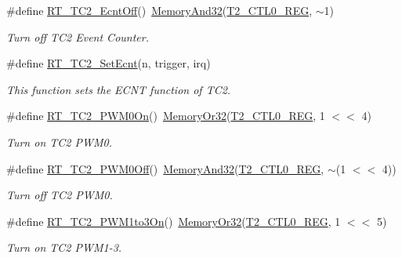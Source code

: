 \begin{DoxyCompactItemize}
\#define \mbox{\hyperlink{a00047_af77e205baae8e267fda5374c167ab76c}{R\+T\+\_\+\+T\+C2\+\_\+\+Ecnt\+Off}}()~\mbox{\hyperlink{a00020_ad87cedffcaadc51db22594fce55173d4}{Memory\+And32}}(\mbox{\hyperlink{a00020_adadaa0ab1ebbd7ba9b70dfd24c3ed44daf2e9deb36631241181cbf09e8d959475}{T2\+\_\+\+C\+T\+L0\+\_\+\+R\+EG}}, $\sim$1)
\begin{DoxyCompactList}\small\item\em Turn off T\+C2 Event Counter. \end{DoxyCompactList}\item 
\#define \mbox{\hyperlink{a00047_af07bf5769df0423324194f22e008e832}{R\+T\+\_\+\+T\+C2\+\_\+\+Set\+Ecnt}}(n,  trigger,  irq)
\begin{DoxyCompactList}\small\item\em This function sets the E\+C\+NT function of T\+C2. \end{DoxyCompactList}\item 
\#define \mbox{\hyperlink{a00047_abaff3048e72dc0cb912c898a0a4c4e14}{R\+T\+\_\+\+T\+C2\+\_\+\+P\+W\+M0\+On}}()~\mbox{\hyperlink{a00020_a27874a97deab7cecdde5ddecf466e31e}{Memory\+Or32}}(\mbox{\hyperlink{a00020_adadaa0ab1ebbd7ba9b70dfd24c3ed44daf2e9deb36631241181cbf09e8d959475}{T2\+\_\+\+C\+T\+L0\+\_\+\+R\+EG}}, 1 $<$$<$ 4)
\begin{DoxyCompactList}\small\item\em Turn on T\+C2 P\+W\+M0. \end{DoxyCompactList}\item 
\#define \mbox{\hyperlink{a00047_a52f984fc9f5bc4d1821025ad8d75f3c9}{R\+T\+\_\+\+T\+C2\+\_\+\+P\+W\+M0\+Off}}()~\mbox{\hyperlink{a00020_ad87cedffcaadc51db22594fce55173d4}{Memory\+And32}}(\mbox{\hyperlink{a00020_adadaa0ab1ebbd7ba9b70dfd24c3ed44daf2e9deb36631241181cbf09e8d959475}{T2\+\_\+\+C\+T\+L0\+\_\+\+R\+EG}}, $\sim$(1 $<$$<$ 4))
\begin{DoxyCompactList}\small\item\em Turn off T\+C2 P\+W\+M0. \end{DoxyCompactList}\item 
\#define \mbox{\hyperlink{a00047_adc090dee2463a2a27b57234e63f0c0b5}{R\+T\+\_\+\+T\+C2\+\_\+\+P\+W\+M1to3\+On}}()~\mbox{\hyperlink{a00020_a27874a97deab7cecdde5ddecf466e31e}{Memory\+Or32}}(\mbox{\hyperlink{a00020_adadaa0ab1ebbd7ba9b70dfd24c3ed44daf2e9deb36631241181cbf09e8d959475}{T2\+\_\+\+C\+T\+L0\+\_\+\+R\+EG}}, 1 $<$$<$ 5)
\begin{DoxyCompactList}\small\item\em Turn on T\+C2 P\+W\+M1-\/3. \end{DoxyCompactList}\item 
$$
\end{DoxyCompactItemize}
